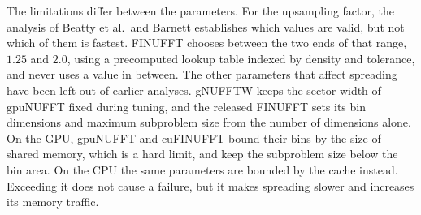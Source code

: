 The limitations differ between the parameters. For the upsampling factor, the analysis of Beatty et al.\ and Barnett establishes which values are valid, but not which of them is fastest. FINUFFT chooses between the two ends of that range, $1.25$ and $2.0$, using a precomputed lookup table indexed by density and tolerance, and never uses a value in between. The other parameters that affect spreading have been left out of earlier analyses. gNUFFTW keeps the sector width of gpuNUFFT fixed during tuning, and the released FINUFFT sets its bin dimensions and maximum subproblem size from the number of dimensions alone. On the GPU, gpuNUFFT and cuFINUFFT bound their bins by the size of shared memory, which is a hard limit, and keep the subproblem size below the bin area. On the CPU the same parameters are bounded by the cache instead. Exceeding it does not cause a failure, but it makes spreading slower and increases its memory traffic.
